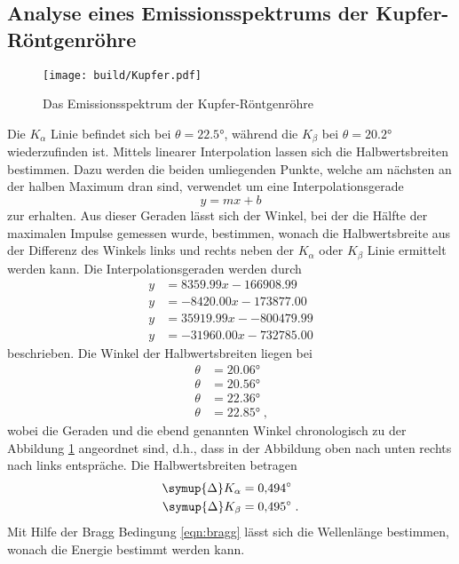 \subsection{Analyse eines Emissionsspektrums der Kupfer-Röntgenröhre} \label{sec:kupferlinien}
\begin{figure}
    \centering
    \caption{Das Emissionsspektrum der Kupfer-Röntgenröhre}
    \label{fig:Kupfer}
    \texttt{[image: build/Kupfer.pdf]}
\end{figure}
Die $K_\alpha$ Linie befindet sich bei $\theta = \ang{22.5;;}$, während die $K_\beta$ bei  $\theta = \ang{20.2;;}$ wiederzufinden ist.
Mittels linearer Interpolation lassen sich die Halbwertsbreiten bestimmen.
Dazu werden die beiden umliegenden Punkte, welche am nächsten an der halben Maximum dran sind, verwendet um eine Interpolationsgerade
\begin{equation*}
    y = mx+b 
\end{equation*}
zur erhalten.
Aus dieser Geraden lässt sich der Winkel, bei der die Hälfte der maximalen Impulse gemessen wurde, bestimmen, wonach die Halbwertsbreite
aus der Differenz des Winkels links und rechts neben der $K_\alpha$ oder $K_\beta$ Linie ermittelt werden kann.
Die Interpolationsgeraden werden durch 
\begin{align*}
    y &= 8359.99x - 166908.99    \\
    y &= -8420.00x - 173877.00   \\
    y &= 35919.99x - -800479.99  \\
    y &= -31960.00x - 732785.00
\end{align*}
beschrieben. 
Die Winkel der Halbwertsbreiten liegen bei 
\begin{align*}
    \theta &= \ang{20.06;;}\\
    \theta &= \ang{20.56;;}\\
    \theta &= \ang{22.36;;}\\
    \theta &= \ang{22.85;;} \; \text{,}
\end{align*}
wobei die Geraden und die ebend genannten Winkel chronologisch zu der Abbildung \ref{fig:Kupfer} angeordnet  sind, d.h., dass in der Abbildung 
oben nach unten rechts nach links entspräche.
Die Halbwertsbreiten betragen
\begin{align*}
    \symup{\Delta}K_\alpha  &= \ang{0.494;;} \\
    \symup{\Delta}K_\beta   &= \ang{0.495;;} \; \text{.}
\end{align*}
Mit Hilfe der Bragg Bedingung \eqref{eqn:bragg} lässt sich die Wellenlänge bestimmen, wonach die Energie bestimmt werden kann.

